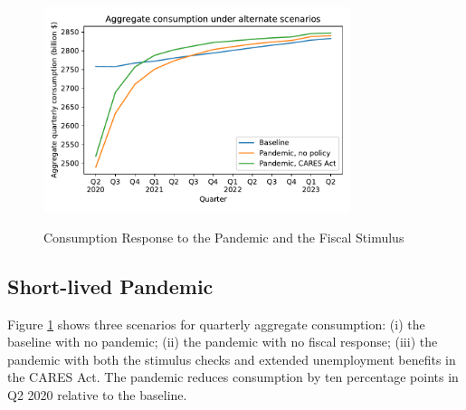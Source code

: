 \documentclass[titlepage,a4paper]{\econtex}
\begin{document}
\begin{figure}
  \centering
  \caption{Consumption Response to the Pandemic and the Fiscal Stimulus}
  \label{cons_response}
  { \includegraphics[width=0.8\textwidth]{./Figures/AggConResp_examples}}
\end{figure}

\subsection{Short-lived Pandemic}

Figure \ref{cons_response} shows three scenarios for quarterly aggregate consumption: (i) the baseline with no pandemic; (ii) the pandemic with no fiscal response; (iii) the pandemic with both the stimulus checks and extended unemployment benefits in the CARES Act.
The pandemic reduces consumption by ten percentage points in Q2 2020 relative to the baseline.
\end{document}
